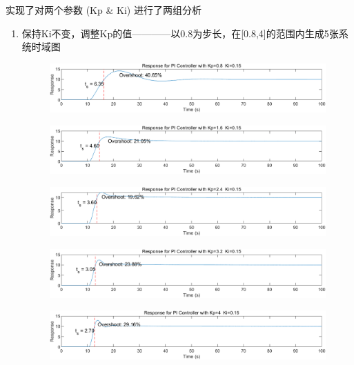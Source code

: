 \documentclass{thuemp}
\begin{document}
实现了对两个参数 (Kp \& Ki) 进行了两组分析
\begin{enumerate}
  \item 保持Ki不变，调整Kp的值————以0.8为步长，在[0.8,4]的范围内生成5张系统时域图
  \begin{figure}[H]
    \centering
    \includegraphics[width=1\linewidth]{./img/PI/i1.png}
  \end{figure}
  \begin{figure}[H]
    \centering
    \includegraphics[width=1\linewidth]{./img/PI/i2.png}
  \end{figure}
  \begin{figure}[H]
    \centering
    \includegraphics[width=1\linewidth]{./img/PI/i3.png}
  \end{figure}
  \begin{figure}[H]
    \centering
    \includegraphics[width=1\linewidth]{./img/PI/i4.png}
  \end{figure}
  \begin{figure}[H]
    \centering
    \includegraphics[width=1\linewidth]{./img/PI/i5.png}
  \end{figure}


\end{enumerate}
\end{document}
